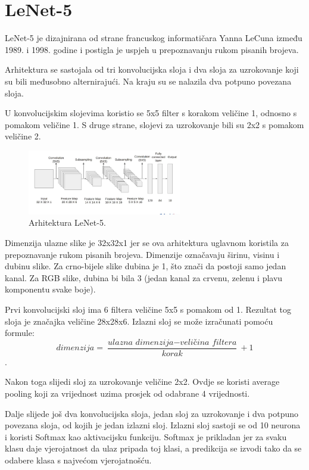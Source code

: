 \section{LeNet-5}\label{sec:lenet-5}
LeNet-5 je dizajnirana od strane francuskog informatičara Yanna LeCuna između 1989. i 1998. godine i postigla je uspjeh u prepoznavanju rukom pisanih brojeva.

Arhitektura se sastojala od tri konvolucijska sloja i dva sloja za uzrokovanje koji su bili međusobno alternirajući. Na kraju su se nalazila dva potpuno povezana sloja.

U konvolucijskim slojevima koristio se 5x5 filter s korakom veličine 1, odnosno s pomakom veličine 1. S druge strane, slojevi za uzrokovanje bili su 2x2 s pomakom veličine 2.
\begin{figure}[h]
    \centering
    \includegraphics[width=0.6\textwidth]{images/LeNet}
    \caption{Arhitektura LeNet-5.
    \protect\footnotemark}
    \label{fig:slika8}
\end{figure}

Dimenzija ulazne slike je 32x32x1 jer se ova arhitektura uglavnom koristila za prepoznavanje rukom pisanih brojeva. Dimenzije označavaju širinu, visinu i dubinu slike. Za crno-bijele slike dubina je 1, što znači da postoji samo jedan kanal. Za RGB slike, dubina bi bila 3 (jedan kanal za crvenu, zelenu i plavu komponentu svake boje).

Prvi konvolucijski sloj ima 6 filtera veličine 5x5 s pomakom od 1.
Rezultat tog sloja je značajka veličine 28x28x6.
Izlazni sloj se može izračunati pomoću formule: \[ \textit{dimenzija} = \frac{\textit{ulazna dimenzija} - \textit{veličina filtera}}{\textit{korak}} + 1 \].

Nakon toga slijedi sloj za uzrokovanje veličine 2x2.
Ovdje se koristi average pooling koji za vrijednost uzima prosjek od odabrane 4 vrijednosti.

Dalje slijede još dva konvolucijska sloja, jedan sloj za uzrokovanje i dva potpuno povezana sloja, od kojih je jedan izlazni sloj.
Izlazni sloj sastoji se od 10 neurona i koristi Softmax kao aktivacijsku funkciju.
Softmax je prikladan jer za svaku klasu daje vjerojatnost da ulaz pripada toj klasi, a predikcija se izvodi tako da se odabere klasa s najvećom vjerojatnošću.

